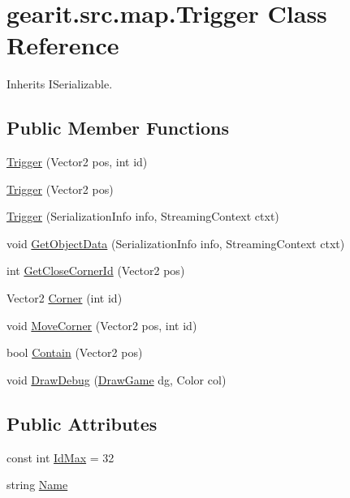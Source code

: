\hypertarget{classgearit_1_1src_1_1map_1_1_trigger}{\section{gearit.\+src.\+map.\+Trigger Class Reference}
\label{classgearit_1_1src_1_1map_1_1_trigger}
}


Inherits I\+Serializable.

\subsection*{Public Member Functions}
\begin{DoxyCompactItemize}
\item 
\hyperlink{classgearit_1_1src_1_1map_1_1_trigger_a6dbcfcde414592cd29d87f5868db85d3}{Trigger} (Vector2 pos, int id)
\item 
\hyperlink{classgearit_1_1src_1_1map_1_1_trigger_a764e9add6641baff3cfc5af2d48b1a26}{Trigger} (Vector2 pos)
\item 
\hyperlink{classgearit_1_1src_1_1map_1_1_trigger_ae56325887273473c3535d214baacc101}{Trigger} (Serialization\+Info info, Streaming\+Context ctxt)
\item 
void \hyperlink{classgearit_1_1src_1_1map_1_1_trigger_a59b3065825a6ca46c1f22e956c6915ad}{Get\+Object\+Data} (Serialization\+Info info, Streaming\+Context ctxt)
\item 
int \hyperlink{classgearit_1_1src_1_1map_1_1_trigger_a12488425a65f31b10573b466244fe563}{Get\+Close\+Corner\+Id} (Vector2 pos)
\item 
Vector2 \hyperlink{classgearit_1_1src_1_1map_1_1_trigger_a8bdcf2351d419c27ad0766ee72e9ee67}{Corner} (int id)
\item 
void \hyperlink{classgearit_1_1src_1_1map_1_1_trigger_a7a7a84780dce3af0fc248d17cb5f5897}{Move\+Corner} (Vector2 pos, int id)
\item 
bool \hyperlink{classgearit_1_1src_1_1map_1_1_trigger_a63852ae167d2b73d9a83b64857b6e64c}{Contain} (Vector2 pos)
\item 
void \hyperlink{classgearit_1_1src_1_1map_1_1_trigger_a01ee77c12b290ebc4c56f47591096704}{Draw\+Debug} (\hyperlink{classgearit_1_1src_1_1_draw_game}{Draw\+Game} dg, Color col)
\end{DoxyCompactItemize}
\subsection*{Public Attributes}
\begin{DoxyCompactItemize}
\item 
const int \hyperlink{classgearit_1_1src_1_1map_1_1_trigger_aefa6f32ee5c2e56b0d8c558327ad8047}{Id\+Max} = 32
\item 
string \hyperlink{classgearit_1_1src_1_1map_1_1_trigger_a7a0302a533e52923f3e25a088825808a}{Name}
\end{DoxyCompactItemize}
